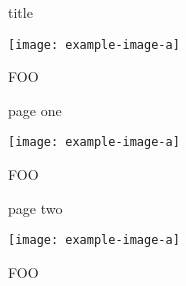 \documentclass{leporello}
\begin{document}
\begin{leporellocolumn}{title}

\begin{leporellobox}[padding={top=5mm}]
\hfill\texttt{[image: example-image-a]}
\end{leporellobox}

\begin{leporellobox}[mystyle]
\Huge{} FOO
\end{leporellobox}

\end{leporellocolumn}

\begin{leporellocolumn}{page one}

\begin{leporellobox}[padding={top=5mm}]
\hfill\texttt{[image: example-image-a]}
\end{leporellobox}

\begin{leporellobox}[mystyle, store height=\myheight]
\Huge{} FOO 
\end{leporellobox}

\begin{leporellobox}[offset={0mm,20mm+\myheight}, bleed={l,b}, background=black!10, stretch height]
\lipsum[1] 
\end{leporellobox}

\end{leporellocolumn}


\begin{leporellocolumn}{page two}

\begin{leporellobox}[padding={top=5mm}]
\raggedleft
\texttt{[image: example-image-a]}
\end{leporellobox}

\begin{leporellobox}[mystyle, store height=\myheight]
\Huge{} FOO 
\end{leporellobox}

\begin{leporellobox}[bleed={t,b,l,r}, background=black!10, align parent={l,b}, align self={l,b}]
\lipsum[1] 
\end{leporellobox}

\end{leporellocolumn}


\end{document}
